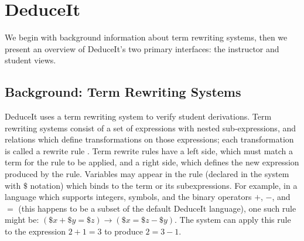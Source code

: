 \documentclass{sigchi}
\newcommand{\msb}[1]{\textbf{\textcolor{cyan}{Michael: #1}}}
\begin{document}
% 
% 
% 

\section{DeduceIt}

We begin with background information about term rewriting systems, then we present an overview of DeduceIt's two primary interfaces: the instructor and student views.

\subsection{Background: Term Rewriting Systems}
DeduceIt uses a term rewriting system to verify student derivations. Term rewriting systems consist of a set of expressions with nested sub-expressions, and relations which define transformations on those expressions; each transformation is called a rewrite rule \cite{rewriting-logic, isabelle}. Term rewrite rules have a left side, which must match a term for the rule to be applied, and a right side, which defines the new expression produced by the rule. Variables may appear in the rule (declared in the system with $\$$ notation) which binds to the term or its subexpressions. For example, in a language which supports integers, symbols, and the binary operators $+$, $-$, and $=$ (this happens to be a subset of the default DeduceIt language), one such rule might be: $(\$x+\$y=\$z) \rightarrow (\$x=\$z-\$y)$. The system can apply this rule to the expression $2+1=3$ to produce $2=3-1$.
\end{document}

